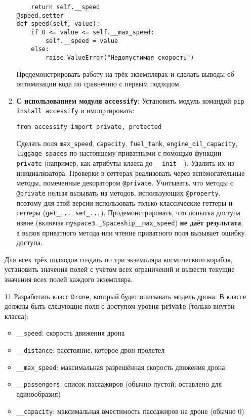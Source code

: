 \begin{enumerate}
\begin{enumerate}
\begin{verbatim}
    return self.__speed
@speed.setter
def speed(self, value):
    if 0 <= value <= self.__max_speed:
        self.__speed = value
    else:
        raise ValueError("Недопустимая скорость")
    \end{verbatim}  
    Продемонстрировать работу на трёх экземплярах и сделать выводы об оптимизации кода по сравнению с первым подходом.
    \item \textbf{С использованием модуля \texttt{accessify}}:  
    Установить модуль командой \texttt{pip install accessify} и импортировать:  
    \begin{verbatim}
from accessify import private, protected
    \end{verbatim}  
    Сделать поля \texttt{max\_speed}, \texttt{capacity}, \texttt{fuel\_tank}, \texttt{engine\_oil\_capacity}, \texttt{luggage\_spaces} по-настоящему приватными с помощью функции \texttt{private} (например, как атрибуты класса до \texttt{\_\_init\_\_}). Удалить их из инициализатора.  
    Проверки в сеттерах реализовать через вспомогательные методы, помеченные декоратором \texttt{@private}.  
    Учитывать, что методы с \texttt{@private} нельзя вызывать из методов, использующих \texttt{@property}, поэтому для этой версии использовать только классические геттеры и сеттеры (\texttt{get\_...}, \texttt{set\_...}).  
    Продемонстрировать, что попытка доступа извне (включая \texttt{myspace3.\_Spaceship\_\_max\_speed}) \textbf{не даёт результата}, а вызов приватного метода или чтение приватного поля вызывает ошибку доступа.
\end{enumerate}
Для всех трёх подходов создать по три экземпляра космического корабля, установить значения полей с учётом всех ограничений и вывести текущие значения всех полей каждого экземпляра.
\item[11] Разработать класс \texttt{Drone}, который будет описывать модель дрона. В классе должны быть следующие поля с доступом уровня \textbf{private} (только внутри класса):
\begin{itemize}
    \item \texttt{\_\_speed}: скорость движения дрона  
    \item \texttt{\_\_distance}: расстояние, которое дрон пролетел  
    \item \texttt{\_\_max\_speed}: максимальная разрешённая скорость движения дрона  
    \item \texttt{\_\_passengers}: список пассажиров (обычно пустой; оставлено для единообразия)  
    \item \texttt{\_\_capacity}: максимальная вместимость пассажиров на дроне (обычно 0)  

\end{itemize}
\end{enumerate}
